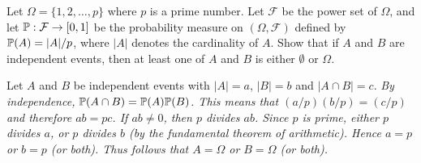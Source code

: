 \begin{exercise}
\begin{questions}


\question
Let $\Omega=\{1,2,\ldots,p\}$ where $p$ is a prime number. Let $\mathcal{F}$ be the power set of $\Omega$, and let $\mathbb{P}:\mathcal{F}\to [0,1]$ be the probability measure on $(\Omega,\mathcal{F})$ defined by $\mathbb{P}(A) = |A|/p$, where $|A|$ denotes the cardinality of $A$. Show that if $A$ and $B$ are independent events, then at least one of $A$ and $B$ is either $\emptyset$ or $\Omega$.
\begin{answer}
Let $A$ and $B$ be independent events with $|A|=a$, $|B|=b$ and $|A\cap B|=c$. 
\bit
\it By independence, $\mathbb{P}(A\cap B)=\mathbb{P}(A)\mathbb{P}(B)$. 
\it This means that $(a/p)(b/p)=(c/p)$ and therefore $ab = pc$. 
\it If $ab\neq 0$, then $p$ divides $ab$.
\it Since $p$ is prime, either $p$ divides $a$, or $p$ divides $b$ (by the fundamental theorem of arithmetic).
\it Hence $a=p$ or $b=p$ (or both). 
\it Thus follows that $A=\Omega$ or $B=\Omega$ (or both).
\eit
\end{answer}

\end{questions}
\end{exercise}

\endinput
